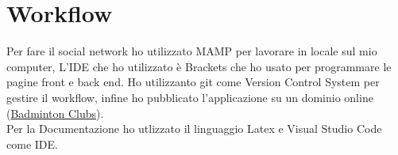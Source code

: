 \documentclass{article}
\begin{document}
\section{Workflow}

Per fare il social network ho utilizzato MAMP per lavorare in locale sul mio computer, L'IDE che ho utilizzato è Brackets che ho usato per programmare le pagine front e back end. Ho utilizzanto git come Version Control System per gestire il workflow, infine ho pubblicato l'applicazione su un dominio online 
(\href{https://www.marcobissessur.it}{Badminton Clubs}). \\
Per la Documentazione ho utlizzato il linguaggio Latex e Visual Studio Code come IDE.
    

    
    
    
\end{document}
